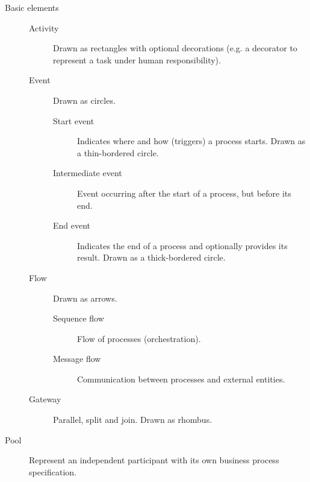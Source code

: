 \begin{description}
    \item[Basic elements] \phantom{}
        \begin{description}
            \item[Activity] 
                Drawn as rectangles with optional decorations (e.g. a decorator to represent a task under human responsibility).
            
            \item[Event] 
                Drawn as circles.

                \begin{description}
                    \item[Start event]
                        Indicates where and how (triggers) a process starts.
                        Drawn as a thin-bordered circle.
                    
                    \item[Intermediate event]
                        Event occurring after the start of a process, but before its end.

                    \item[End event]
                        Indicates the end of a process and optionally provides its result.
                        Drawn as a thick-bordered circle.
                \end{description}
            
            \item[Flow] 
                Drawn as arrows.

                \begin{description}
                    \item[Sequence flow] 
                        Flow of processes (orchestration).

                    \item[Message flow] 
                        Communication between processes and external entities.
                \end{description}
            
            \item[Gateway] 
                Parallel, split and join. Drawn as rhombus.
        \end{description}

    \item[Pool] 
        Represent an independent participant with its own business process specification.
    

\end{description}
